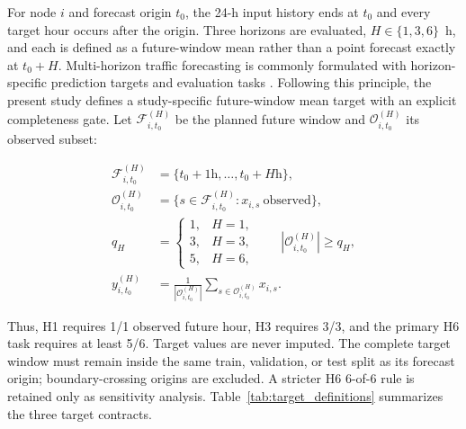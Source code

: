 \documentclass[pdflatex,sn-basic,Numbered]{sn-jnl}
\begin{document}
For node $i$ and forecast origin $t_0$, the 24-h input history ends at $t_0$ and every target hour occurs after the origin. Three horizons are evaluated, $H\in\{1,3,6\}$~h, and each is defined as a future-window mean rather than a point forecast exactly at $t_0+H$. Multi-horizon traffic forecasting is commonly formulated with horizon-specific prediction targets and evaluation tasks \cite{Hadry2025TrafficForecasting,Zeb2024FeatureProjection}. Following this principle, the present study defines a study-specific future-window mean target with an explicit completeness gate. Let $\mathcal{F}_{i,t_0}^{(H)}$ be the planned future window and $\mathcal{O}_{i,t_0}^{(H)}$ its observed subset:

\begin{equation}
\begin{aligned}
\mathcal{F}_{i,t_0}^{(H)}&=\{t_0+1\mathrm{h},\ldots,t_0+H\mathrm{h}\},\\
\mathcal{O}_{i,t_0}^{(H)}&=\{s\in\mathcal{F}_{i,t_0}^{(H)}:x_{i,s}\ \text{observed}\},\\
q_H&=\begin{cases}1,&H=1,\\3,&H=3,\\5,&H=6,\end{cases}
\qquad |\mathcal{O}_{i,t_0}^{(H)}|\ge q_H,\\
y_{i,t_0}^{(H)}&=\frac{1}{|\mathcal{O}_{i,t_0}^{(H)}|}
\sum_{s\in\mathcal{O}_{i,t_0}^{(H)}}x_{i,s}.
\end{aligned}
\label{eq:target_contract}
\end{equation}

Thus, H1 requires 1/1 observed future hour, H3 requires 3/3, and the primary H6 task requires at least 5/6. Target values are never imputed. The complete target window must remain inside the same train, validation, or test split as its forecast origin; boundary-crossing origins are excluded. A stricter H6 6-of-6 rule is retained only as sensitivity analysis. Table~\ref{tab:target_definitions} summarizes the three target contracts.
\end{document}
